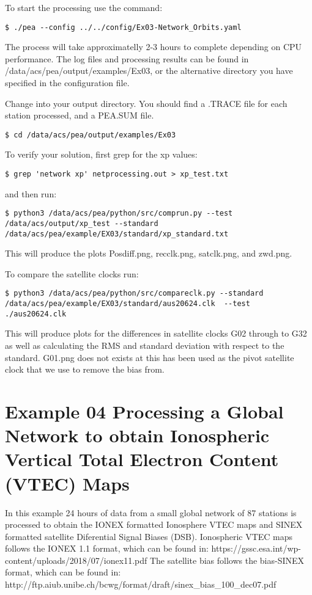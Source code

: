 To start the processing use the command:
\begin{verbatim}
$ ./pea --config ../../config/Ex03-Network_Orbits.yaml
\end{verbatim}
The process will take approximatelly 2-3 hours to complete depending on CPU performance. The log files and processing results can be found in /data/acs/pea/output/examples/Ex03, or the alternative directory you have specified in the configuration file.

Change into your output directory. You should find a .TRACE file for each station processed, and a PEA.SUM file.
\begin{verbatim}
$ cd /data/acs/pea/output/examples/Ex03
\end{verbatim}
To verify your solution, first grep for the xp values:
\begin{verbatim}
$ grep 'network xp' netprocessing.out > xp_test.txt
\end{verbatim}
and then run:
\begin{verbatim}
$ python3 /data/acs/pea/python/src/comprun.py --test /data/acs/output/xp_test --standard /data/acs/pea/example/EX03/standard/xp_standard.txt
\end{verbatim}
This will produce the plots Posdiff.png, recclk.png, satclk.png, and zwd.png.

To compare the satellite clocks run:
\begin{verbatim}
$ python3 /data/acs/pea/python/src/compareclk.py --standard /data/acs/pea/example/EX03/standard/aus20624.clk  --test ./aus20624.clk
\end{verbatim}
This will produce plots for the differences in satellite clocks G02 through to G32 as well as calculating the RMS and standard deviation with respect to the standard. G01.png does not exists at this has been used as the pivot satellite clock that we use to remove the bias from.

\section{Example 04 Processing a Global Network to obtain Ionospheric Vertical Total Electron Content (VTEC) Maps}
In this example 24 hours of data from a small global network of 87 stations is processed to obtain the IONEX formatted Ionosphere VTEC maps and SINEX formatted satellite Diferential Signal Biases (DSB). 
Ionospheric VTEC maps follows the IONEX 1.1 format, which can be found in: https://gssc.esa.int/wp-content/uploads/2018/07/ionex11.pdf 
The satellite bias follows the bias-SINEX format, which can be found in: http://ftp.aiub.unibe.ch/bcwg/format/draft/sinex\_bias\_100\_dec07.pdf

